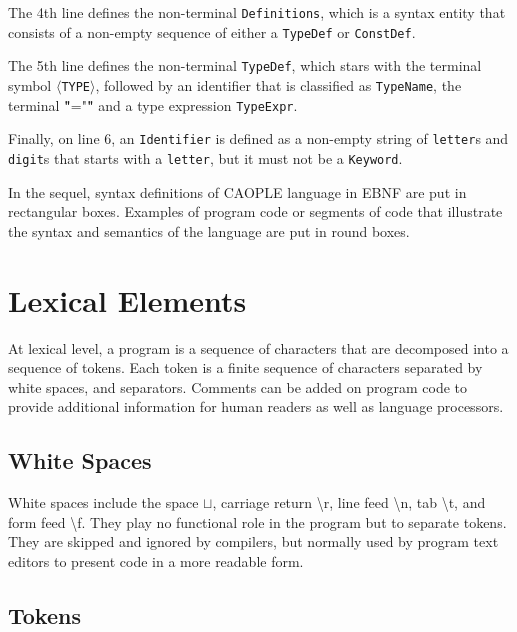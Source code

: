 \documentclass[english]{report}
\newcommand{\choice}{\color{red} \textbf{ | } \color{black}}
\newcommand{\defs}{\color{red}\textbf{::=}\color{black}}
\newcommand{\tml}[1]{\color{blue}$\langle$#1$\rangle$\color{black}}
\newcommand{\rptn}[1]{\color{red} \textbf{\{} \color{black} #1 \color{red}\textbf{\}$^+$} \color{black}}
\newcommand{\lit}[1]{\color{red} \textbf{"}\color{blue}#1\color{red}\textbf{"} \color{black}}
\newcommand{\JavaCCsyntax}[1]{%
	\vspace{2mm}
	{\color{black}
	\noindent{
		\framebox{
			\begin{minipage}[t]{1\columnwidth-3mm}
				{ #1 }
			\end{minipage}}}}
	\vspace{2mm}}
\begin{document}
The 4th line defines the non-terminal \texttt{Definitions}, which is a syntax entity that consists of a non-empty sequence of either a \texttt{TypeDef} or \texttt{ConstDef}. 

The 5th line defines the non-terminal \texttt{TypeDef}, which stars with the terminal symbol \texttt{\tml{TYPE}}, followed by an identifier that is classified as \texttt{TypeName}, the terminal \lit{="} and a type expression \texttt{TypeExpr}. 

Finally, on line 6, an \texttt{Identifier} is defined as a non-empty string of \texttt{letter}s and \texttt{digit}s that starts with a \texttt{letter}, but it must not be a \texttt{Keyword}. 

In the sequel, syntax definitions of CAOPLE language in EBNF are put in rectangular boxes. Examples of program code or segments of code that illustrate the syntax and semantics of the language are put in round boxes.

\chapter{Lexical Elements}\label{sect:Lexical}

At lexical level, a program is a sequence of characters that are decomposed into a sequence of tokens. Each token is a finite sequence of characters separated by white spaces, and separators. Comments can be added on program code to provide additional information for human readers as well as language processors. 

\section{White Spaces} 

\JavaCCsyntax{
White Spaces \defs \rptn{ \lit{$\sqcup$} \choice \lit{\textbackslash t} \choice \lit{\textbackslash n} \choice \lit{\textbackslash r} \choice \lit{\textbackslash f}}
}

White spaces include the space $\sqcup$, carriage return \textbackslash r, line feed \textbackslash n,  tab \textbackslash t, and form feed \textbackslash f. They play no functional role in the program but to separate tokens. They are skipped and ignored by compilers, but normally used by program text editors to present code in a more readable form. 

\section{Tokens}
\end{document}
